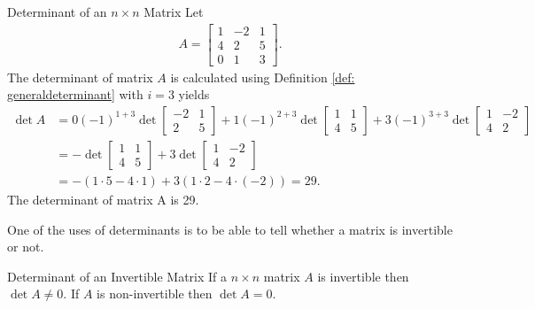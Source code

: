 \begin{example}{Determinant of an $n\times n$ Matrix}
Let
    \begin{align*}
        A=\begin{bmatrix}
           1 & -2 & 1\\
           4 & 2 & 5\\
           0 & 1 & 3
        \end{bmatrix}.
    \end{align*}
    The determinant of matrix $A$ is calculated using Definition \ref{def: generaldeterminant} with $i=3$ yields
    \begin{align*}
        \det A &= 0(-1)^{1+3} \det
        \begin{bmatrix}
           -2 & 1\\
           2 & 5
        \end{bmatrix}
        +1(-1)^{2+3}\det 
        \begin{bmatrix}
           1 & 1\\
           4 & 5
        \end{bmatrix}
        +3(-1)^{3+3}\det 
        \begin{bmatrix}
           1 & -2\\
           4 & 2
        \end{bmatrix}\\
        &=
        - \det 
        \begin{bmatrix}
           1 & 1\\
           4 & 5
        \end{bmatrix}
        +3 \det 
        \begin{bmatrix}
           1 & -2\\
           4 & 2
        \end{bmatrix}\\
        &=-(1\cdot5-4\cdot1)+3(1\cdot2-4\cdot(-2))=29.
    \end{align*}
    The determinant of matrix A is 29. 
\end{example}
One of the uses of determinants is to be able to tell whether a matrix is invertible or not.
\begin{theorem}{Determinant of an Invertible Matrix}
    If a $n\times n$ matrix $A$ is invertible then $\det A \neq 0$. If $A$ is non-invertible then $\det A = 0$.
    \cite[214]{LiAl}
    \label{theo: det_intvertible_matrix}
\end{theorem}
